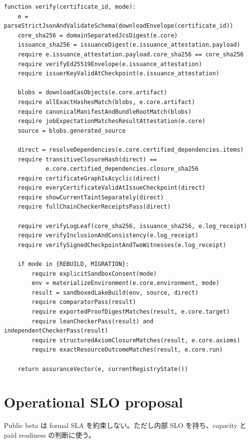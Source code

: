 \documentclass[a4paper,11pt]{ltjsarticle}
\begin{document}
\begin{lstlisting}[language={},basicstyle=\ttfamily\scriptsize,caption={Reference verification pseudocode}]
function verify(certificate_id, mode):
    e = parseStrictJsonAndValidateSchema(downloadEnvelope(certificate_id))
    core_sha256 = domainSeparatedJcsDigest(e.core)
    issuance_sha256 = issuanceDigest(e.issuance_attestation.payload)
    require e.issuance_attestation.payload.core_sha256 == core_sha256
    require verifyEd25519Envelope(e.issuance_attestation)
    require issuerKeyValidAtCheckpoint(e.issuance_attestation)

    blobs = downloadCasObjects(e.core.artifact)
    require allExactHashesMatch(blobs, e.core.artifact)
    require canonicalManifestAndBundleRootMatch(blobs)
    require jobExpectationMatchesResultAttestation(e.core)
    source = blobs.generated_source

    direct = resolveDependencies(e.core.certified_dependencies.items)
    require transitiveClosureHash(direct) ==
            e.core.certified_dependencies.closure_sha256
    require certificateGraphIsAcyclic(direct)
    require everyCertificateValidAtIssueCheckpoint(direct)
    require showCurrentTaintSeparately(direct)
    require fullChainCheckerReceiptsPass(direct)

    require verifyLogLeaf(core_sha256, issuance_sha256, e.log_receipt)
    require verifyInclusionAndConsistency(e.log_receipt)
    require verifySignedCheckpointAndTwoWitnesses(e.log_receipt)

    if mode in {REBUILD, MIGRATION}:
        require explicitSandboxConsent(mode)
        env = materializeEnvironment(e.core.environment, mode)
        result = sandboxedLakeBuild(env, source, direct)
        require comparatorPass(result)
        require exportedProofDigestMatches(result, e.core.target)
        require leanCheckerPass(result) and independentCheckerPass(result)
        require structuredAxiomClosureMatches(result, e.core.axioms)
        require exactResourceOutcomeMatches(result, e.core.run)

    return assuranceVector(e, currentRegistryState())
\end{lstlisting}

\section{Operational SLO proposal}

Public beta は formal SLA を約束しない。ただし内部 SLO を持ち、capacity と paid readiness の判断に使う。
\end{document}
